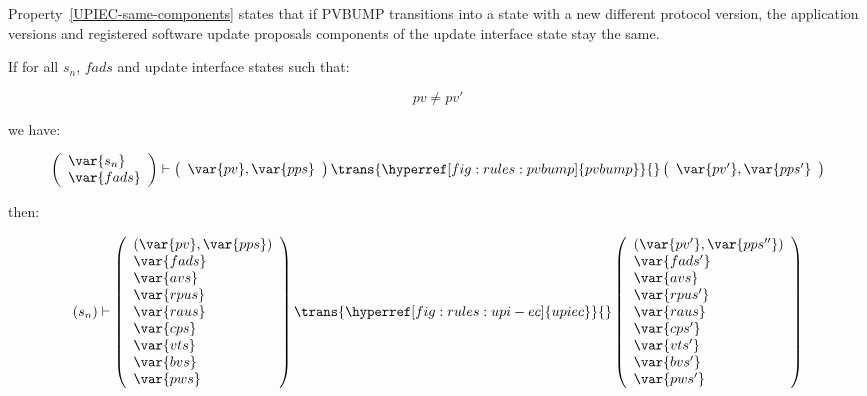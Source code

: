 Property~\ref{UPIEC-same-components} states that if PVBUMP transitions into a
state with a new different protocol version, the application versions and
registered software update proposals components of the update interface state
stay the same.

\begin{property}\label{UPIEC-same-components}
  \textnormal{If for all $s_n$, $fads$ and update interface states such that:}

  $$
  pv \neq pv'
  $$

  \textnormal{we have:}
  
  $$
  \left(
    \begin{array}{l}
      \var{s_n}\\
      \var{fads}
    \end{array}
  \right)
  \vdash
  \left(
    \begin{array}{l}
      \var{pv}, \var{pps}\\
    \end{array}
  \right)
  \trans{\hyperref[fig:rules:pvbump]{pvbump}}{}
  \left(
    \begin{array}{l}
      \var{pv'}, \var{pps'}\\
    \end{array}
  \right)
  $$

  \textnormal{then:}

  $$
  (s_n)
  \vdash
  \left(
    \begin{array}{l}
      (\var{pv}, \var{pps})\\
      \var{fads}\\
      \var{avs}\\
      \var{rpus}\\
      \var{raus}\\
      \var{cps}\\
      \var{vts}\\
      \var{bvs}\\
      \var{pws}
    \end{array}
  \right)
  \trans{\hyperref[fig:rules:upi-ec]{upiec}}{}
  \left(
    \begin{array}{l}
      (\var{pv'}, \var{pps''})\\
      \var{fads'}\\
      \var{avs}\\
      \var{rpus'}\\
      \var{raus}\\
      \var{cps'}\\
      \var{vts'}\\
      \var{bvs'}\\
      \var{pws'}
    \end{array}
  \right)
  $$
  
\end{property}


